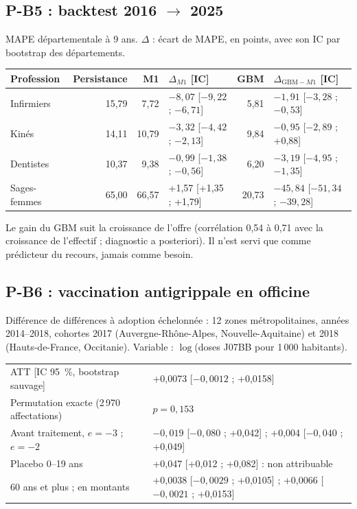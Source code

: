 \documentclass[11pt]{article}
\begin{document}
\subsection{P-B5 : backtest 2016 $\to$ 2025}
MAPE départementale à 9 ans. $\Delta$ : écart de MAPE, en points, avec son IC par bootstrap des départements.
\begin{center}\footnotesize
\begin{tabular}{@{}lrrlrl@{}}
\toprule
Profession & Persistance & M1 & $\Delta_{M1}$ [IC] & GBM & $\Delta_{\mathrm{GBM}-M1}$ [IC] \\
\midrule
Infirmiers & 15,79 & 7,72 & $-8{,}07$ [$-9{,}22$ ; $-6{,}71$] & 5,81 & $-1{,}91$ [$-3{,}28$ ; $-0{,}53$] \\
Kinés & 14,11 & 10,79 & $-3{,}32$ [$-4{,}42$ ; $-2{,}13$] & 9,84 & $-0{,}95$ [$-2{,}89$ ; +0,88] \\
Dentistes & 10,37 & 9,38 & $-0{,}99$ [$-1{,}38$ ; $-0{,}56$] & 6,20 & $-3{,}19$ [$-4{,}95$ ; $-1{,}35$] \\
Sages-femmes & 65,00 & 66,57 & +1,57 [+1,35 ; +1,79] & 20,73 & $-45{,}84$ [$-51{,}34$ ; $-39{,}28$] \\
\bottomrule
\end{tabular}
\end{center}
Le gain du GBM suit la croissance de l'offre (corrélation 0,54 à 0,71 avec la croissance de l'effectif ; diagnostic a
posteriori). Il n'est servi que comme prédicteur du recours, jamais comme besoin.

\subsection{P-B6 : vaccination antigrippale en officine}
Différence de différences à adoption échelonnée : 12 zones métropolitaines, années 2014--2018, cohortes 2017
(Auvergne-Rhône-Alpes, Nouvelle-Aquitaine) et 2018 (Hauts-de-France, Occitanie). Variable :
$\log$(doses J07BB pour 1\,000 habitants).
\begin{center}\footnotesize
\begin{tabular}{@{}ll@{}}
\toprule
ATT [IC 95~\%, bootstrap sauvage] & +0,0073 [$-0{,}0012$ ; +0,0158] \\
Permutation exacte (2\,970 affectations) & $p=0{,}153$ \\
Avant traitement, $e=-3$ ; $e=-2$ & $-0{,}019$ [$-0{,}080$ ; +0,042] ; +0,004 [$-0{,}040$ ; +0,049] \\
Placebo 0--19 ans & +0,047 [+0,012 ; +0,082] : non attribuable \\
60 ans et plus ; en montants & +0,0038 [$-0{,}0029$ ; +0,0105] ; +0,0066 [$-0{,}0021$ ; +0,0153] \\
\bottomrule
\end{tabular}
\end{center}
\end{document}
